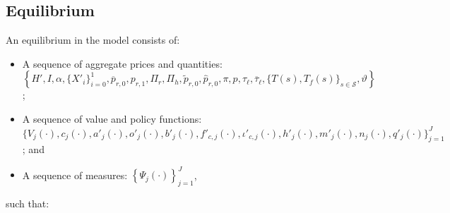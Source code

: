 \documentclass[parskip=full]{article}
\begin{document}
\subsection{Equilibrium}
An equilibrium in the model consists of: 
\begin{itemize}
   \item A sequence of aggregate prices and     quantities:\\   
    $\left\{H', I, \alpha, \{X'_{i}\}_{i=0}^{1},    \overline{p}_{r,0}, p_{r,1}, \Pi_r, \Pi_h, \tilde{p}_{r,0}, \hat{p}_{r,0}, \pi, p, \tau_{\ell}, \overline{\tau}_{\ell}, \{T(s), T_f(s)\}_{s \in \mathcal{S}}, \vartheta \right\}$;
    \item A sequence of value and policy functions: \\
    $\biggl\{V_{j}(\cdot),c_{j}(\cdot),a'_{j}(\cdot),o'_{j}(\cdot),b'_{j}(\cdot),f'_{c,j}(\cdot),\iota'_{c,j}(\cdot),h'_{j}(\cdot),m'_{j}(\cdot),n_{j}(\cdot),q'_{j}(\cdot)\biggl\}_{j=1}^J$; and
    \item A sequence of measures: 
     $\left\{\Psi_{j}(\cdot)\right\}_{j=1}^J$,
\end{itemize}
\noindent such that:
\end{document}
